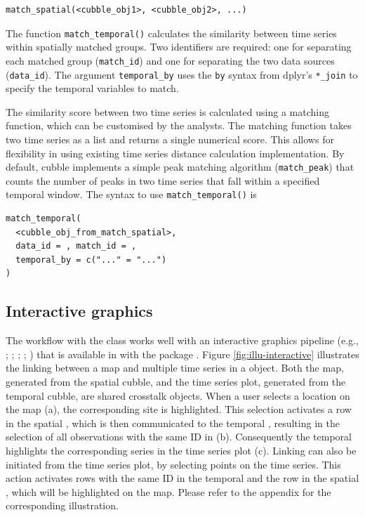 \documentclass[
  shortnames]{jss}
\begin{document}
\begin{verbatim}
match_spatial(<cubble_obj1>, <cubble_obj2>, ...)
\end{verbatim}

The function \texttt{match\_temporal()} calculates the similarity between time series within spatially matched groups. Two identifiers are required: one for separating each matched group (\texttt{match\_id}) and one for separating the two data sources (\texttt{data\_id}). The argument \texttt{temporal\_by} uses the \texttt{by} syntax from dplyr's \texttt{*\_join} to specify the temporal variables to match.

The similarity score between two time series is calculated using a matching function, which can be customised by the analysts. The matching function takes two time series as a list and returns a single numerical score. This allows for flexibility in using existing time series distance calculation implementation. By default, cubble implements a simple peak matching algorithm (\texttt{match\_peak}) that counts the number of peaks in two time series that fall within a specified temporal window. The syntax to use \texttt{match\_temporal()} is

\begin{verbatim}
match_temporal(
  <cubble_obj_from_match_spatial>, 
  data_id = , match_id = , 
  temporal_by = c("..." = "...")
)
\end{verbatim}

\hypertarget{interactive-graphics}{%
\subsection{Interactive graphics}\label{interactive-graphics}}

The workflow with the  class works well with an interactive graphics pipeline (e.g., \citet{buja1988elements}; \citet{buja1996interactive}; \citet{sutherland2000orca}; \citet{xie2014reactive}; \citet{cheng2016enabling}) that is available in  with the package  \citep{crosstalk}. Figure \ref{fig:illu-interactive} illustrates the linking between a map and multiple time series in a  object. Both the map, generated from the spatial cubble, and the time series plot, generated from the temporal cubble, are shared crosstalk objects. When a user selects a location on the map (a), the corresponding site is highlighted. This selection activates a row in the spatial , which is then communicated to the temporal , resulting in the selection of all observations with the same ID in (b). Consequently the temporal  highlights the corresponding series in the time series plot (c). Linking can also be initiated from the time series plot, by selecting points on the time series. This action activates rows with the same ID in the temporal  and the row in the spatial , which will be highlighted on the map. Please refer to the appendix for the corresponding illustration.
\end{document}
